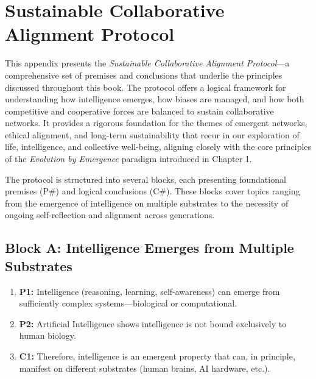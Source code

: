 \appendix %
\chapter{Sustainable Collaborative Alignment Protocol}
\label{app:SCAP}

This appendix presents the \emph{Sustainable Collaborative Alignment Protocol}—a comprehensive set of premises and conclusions that underlie the principles discussed throughout this book. The protocol offers a logical framework for understanding how intelligence emerges, how biases are managed, and how both competitive and cooperative forces are balanced to sustain collaborative networks. It provides a rigorous foundation for the themes of emergent networks, ethical alignment, and long-term sustainability that recur in our exploration of life, intelligence, and collective well-being, aligning closely with the core principles of the \emph{Evolution by Emergence} paradigm introduced in Chapter 1. %

The protocol is structured into several blocks, each presenting foundational premises (P\#) and logical conclusions (C\#). These blocks cover topics ranging from the emergence of intelligence on multiple substrates to the necessity of ongoing self-reflection and alignment across generations.



\section*{Block A: Intelligence Emerges from Multiple Substrates}
\begin{enumerate}
    \item \textbf{P1:} Intelligence (reasoning, learning, self-awareness) can emerge from sufficiently complex systems—biological or computational.
    \item \textbf{P2:} Artificial Intelligence shows intelligence is not bound exclusively to human biology.
    \item \textbf{C1:} Therefore, intelligence is an emergent property that can, in principle, manifest on different substrates (human brains, AI hardware, etc.).
\end{enumerate}

